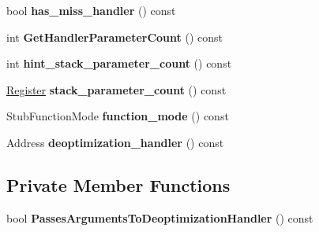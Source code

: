 \begin{DoxyCompactItemize}
\item 
bool {\bfseries has\+\_\+miss\+\_\+handler} () const \hypertarget{classv8_1_1internal_1_1_code_stub_descriptor_ac90fad01161c74990d37a98e34e42bfd}{}\label{classv8_1_1internal_1_1_code_stub_descriptor_ac90fad01161c74990d37a98e34e42bfd}

\item 
int {\bfseries Get\+Handler\+Parameter\+Count} () const \hypertarget{classv8_1_1internal_1_1_code_stub_descriptor_a30560c1485e2f8150375bacc28995b27}{}\label{classv8_1_1internal_1_1_code_stub_descriptor_a30560c1485e2f8150375bacc28995b27}

\item 
int {\bfseries hint\+\_\+stack\+\_\+parameter\+\_\+count} () const \hypertarget{classv8_1_1internal_1_1_code_stub_descriptor_a7123351a7549c29459cdb3f91e72ae2f}{}\label{classv8_1_1internal_1_1_code_stub_descriptor_a7123351a7549c29459cdb3f91e72ae2f}

\item 
\hyperlink{structv8_1_1internal_1_1_register}{Register} {\bfseries stack\+\_\+parameter\+\_\+count} () const \hypertarget{classv8_1_1internal_1_1_code_stub_descriptor_aa4dee595e6222f1ba0f270e244c22b81}{}\label{classv8_1_1internal_1_1_code_stub_descriptor_aa4dee595e6222f1ba0f270e244c22b81}

\item 
Stub\+Function\+Mode {\bfseries function\+\_\+mode} () const \hypertarget{classv8_1_1internal_1_1_code_stub_descriptor_ad221d2db7a608f39ad482269aa65b9aa}{}\label{classv8_1_1internal_1_1_code_stub_descriptor_ad221d2db7a608f39ad482269aa65b9aa}

\item 
Address {\bfseries deoptimization\+\_\+handler} () const \hypertarget{classv8_1_1internal_1_1_code_stub_descriptor_a2a88c7aa3db720bc883c420becc65cf3}{}\label{classv8_1_1internal_1_1_code_stub_descriptor_a2a88c7aa3db720bc883c420becc65cf3}

\end{DoxyCompactItemize}
\subsection*{Private Member Functions}
\begin{DoxyCompactItemize}
\item 
bool {\bfseries Passes\+Arguments\+To\+Deoptimization\+Handler} () const \hypertarget{classv8_1_1internal_1_1_code_stub_descriptor_a73c15b168d01b4c8f8a9d2c982e2f64c}{}\label{classv8_1_1internal_1_1_code_stub_descriptor_a73c15b168d01b4c8f8a9d2c982e2f64c}

\end{DoxyCompactItemize}
